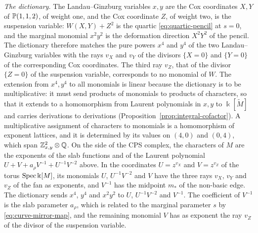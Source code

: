 \emph{The dictionary.}  The Landau--Ginzburg variables $x,y$ are the Cox
coordinates $X,Y$ of $\mathbb P(1,1,2)$, of weight one, and the Cox coordinate $Z$,
of weight two, is the suspension variable: $W(X,Y)+Z^2$ is the quartic
\eqref{eq:quartic-pencil} at $s=0$, and the marginal monomial $x^2y^2$ is the
deformation direction $X^2Y^2$ of the pencil.  The dictionary therefore
matches the pure powers $x^4$ and $y^4$ of the two Landau--Ginzburg variables
with the rays $v_X$ and $v_Y$ of the divisors $\{X=0\}$ and $\{Y=0\}$ of the
corresponding Cox coordinates.  The third ray $v_Z$, that of the divisor
$\{Z=0\}$ of the suspension variable, corresponds to no monomial of $W$.  The
extension from $x^4,y^4$ to all monomials is linear because the dictionary
is to be multiplicative: it must send products of monomials to products of
characters, so that it extends to a homomorphism from Laurent polynomials in
$x,y$ to $\Bbbk[\widetilde M]$ and carries derivations to derivations
(Proposition~\ref{prop:integral-cofactor}).  A multiplicative assignment of
characters to monomials is a homomorphism of exponent lattices, and it is
determined by its values on $(4,0)$ and $(0,4)$, which span
$\mathbb Z^2_{x,y}\otimes\mathbb Q$.  On the side of the CPS complex, the characters of
$M$ are the exponents of the slab functions and of the Laurent polynomial
$U+V+a_\rho V^{-1}+U^{-1}V^{-2}$ above.  In the coordinates $U=z^{v_X}$ and
$V=z^{v_Z}$ of the torus $\operatorname{Spec}\Bbbk[M]$, its monomials $U$,
$U^{-1}V^{-2}$ and $V$ have the three rays $v_X$, $v_Y$ and $v_Z$ of the fan
as exponents, and $V^{-1}$ has the midpoint $m_*$ of the non-basic edge.  The
dictionary sends $x^4$, $y^4$ and $x^2y^2$ to $U$, $U^{-1}V^{-2}$ and
$V^{-1}$.  The coefficient of $V^{-1}$ is the slab parameter $a_\rho$, which is
related to the marginal parameter $s$ by \eqref{eq:curve-mirror-map}, and the
remaining monomial $V$ has as exponent the ray $v_Z$ of the divisor of the
suspension variable.

